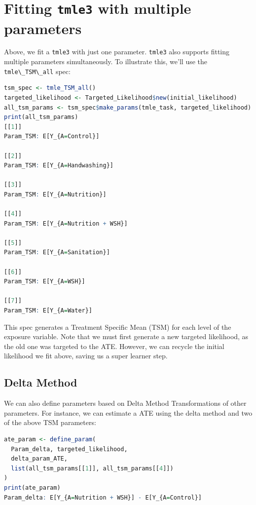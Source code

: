 \documentclass[
  12pt, krantz2,
]{book}
\newcommand{\passthrough}[1]{#1}
\theoremstyle{definition}
\theoremstyle{definition}
\theoremstyle{definition}
\newcommand{\1}{\mathbbm{1}}
\begin{document}
\hypertarget{fitting-tmle3-with-multiple-parameters}{%
\section{\texorpdfstring{Fitting \texttt{tmle3} with multiple parameters}{Fitting tmle3 with multiple parameters}}\label{fitting-tmle3-with-multiple-parameters}}

Above, we fit a \passthrough{\lstinline!tmle3!} with just one parameter. \passthrough{\lstinline!tmle3!} also supports fitting
multiple parameters simultaneously. To illustrate this, we'll use the
\passthrough{\lstinline!tmle\_TSM\_all!} spec:

\begin{lstlisting}[language=R]
tsm_spec <- tmle_TSM_all()
targeted_likelihood <- Targeted_Likelihood$new(initial_likelihood)
all_tsm_params <- tsm_spec$make_params(tmle_task, targeted_likelihood)
print(all_tsm_params)
[[1]]
Param_TSM: E[Y_{A=Control}]

[[2]]
Param_TSM: E[Y_{A=Handwashing}]

[[3]]
Param_TSM: E[Y_{A=Nutrition}]

[[4]]
Param_TSM: E[Y_{A=Nutrition + WSH}]

[[5]]
Param_TSM: E[Y_{A=Sanitation}]

[[6]]
Param_TSM: E[Y_{A=WSH}]

[[7]]
Param_TSM: E[Y_{A=Water}]
\end{lstlisting}

This spec generates a Treatment Specific Mean (TSM) for each level of the
exposure variable. Note that we must first generate a new targeted likelihood,
as the old one was targeted to the ATE. However, we can recycle the initial
likelihood we fit above, saving us a super learner step.

\hypertarget{delta-method}{%
\subsection{Delta Method}\label{delta-method}}

We can also define parameters based on Delta Method Transformations of other
parameters. For instance, we can estimate a ATE using the delta method and two
of the above TSM parameters:

\begin{lstlisting}[language=R]
ate_param <- define_param(
  Param_delta, targeted_likelihood,
  delta_param_ATE,
  list(all_tsm_params[[1]], all_tsm_params[[4]])
)
print(ate_param)
Param_delta: E[Y_{A=Nutrition + WSH}] - E[Y_{A=Control}]
\end{lstlisting}
\end{document}
